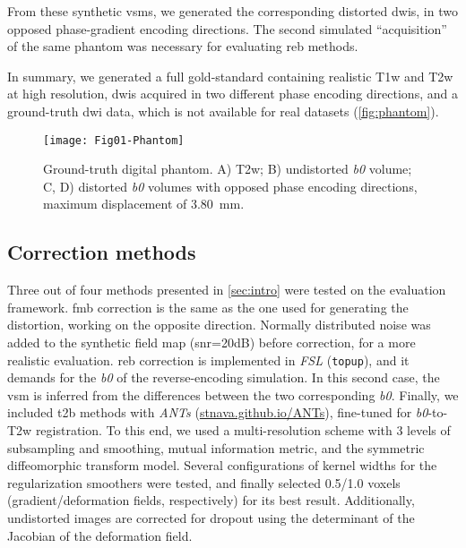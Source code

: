 From these synthetic \glspl*{vsm}, we generated the corresponding distorted \glspl*{dwi},
  in two opposed phase-gradient encoding directions.
The second simulated ``acquisition'' of the same phantom was necessary for evaluating \gls*{reb}
  methods.

In summary, we generated a full gold-standard containing realistic T1w and T2w
  at high resolution, \glspl*{dwi} acquired in two different phase encoding directions,
  and a ground-truth \gls*{dwi} data, which is not available for real datasets
  (\autoref{fig:phantom}).


\begin{figure}[thpb]
   \centering
   \texttt{[image: Fig01-Phantom]}
   \caption{Ground-truth digital phantom.
   A) T2w; B) undistorted \textit{b0} volume;
   C, D) distorted \textit{b0} volumes with opposed phase 
   encoding directions, maximum displacement of 3.80~mm.}
   \label{fig:phantom}
\end{figure}

\subsection{Correction methods}
\label{sec:correction}
Three out of four methods presented in \autoref{sec:intro} were tested on the
  evaluation framework.
\Gls*{fmb} correction is the same as the one used for generating the distortion,
  working on the opposite direction.
Normally distributed noise was added to the synthetic field map (\gls*{snr}=20dB)
  before correction, for a more realistic evaluation.
\Gls*{reb} correction is implemented in \emph{FSL} (\texttt{topup}), and it demands for the \textit{b0}
  of the reverse-encoding simulation.
In this second case, the \gls*{vsm} is inferred from the differences between the two corresponding 
  \textit{b0}.
Finally, we included \Gls*{t2b} methods with \emph{ANTs} (\url{stnava.github.io/ANTs}),
  fine-tuned for \textit{b0}-to-T2w registration.
To this end, we used a multi-resolution scheme with 3 levels of subsampling and smoothing,
  mutual information metric, and the symmetric diffeomorphic transform model.
Several configurations of kernel widths for the regularization smoothers were tested, and finally
  selected 0.5/1.0 voxels (gradient/deformation fields, respectively) for its best result.
Additionally, undistorted images are corrected for dropout using the determinant of the Jacobian 
  of the deformation field.

